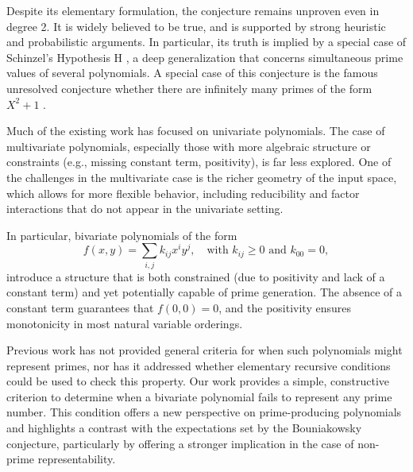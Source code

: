 \documentclass[a4paper,11pt]{article}
\begin{document}
	Despite its elementary formulation, the conjecture remains unproven even in degree 2. It is widely believed to be true, and is supported by strong heuristic and probabilistic arguments. In particular, its truth is implied by a special case of Schinzel's Hypothesis H \cite{bodin}, a deep generalization that concerns simultaneous prime values of several polynomials. A special case of this conjecture is the famous unresolved conjecture whether there are infinitely many primes of the form $X^2+1$ \cite{xsquare}.
	
	Much of the existing work has focused on univariate polynomials. The case of multivariate polynomials, especially those with more algebraic structure or constraints (e.g., missing constant term, positivity), is far less explored. One of the challenges in the multivariate case is the richer geometry of the input space, which allows for more flexible behavior, including reducibility and factor interactions that do not appear in the univariate setting.
	
	In particular, bivariate polynomials of the form
	\[
	f(x, y) = \sum_{i, j} k_{ij} x^i y^j, \quad \text{with } k_{ij} \geq 0 \text{ and } k_{00} = 0,
	\]
	introduce a structure that is both constrained (due to positivity and lack of a constant term) and yet potentially capable of prime generation. The absence of a constant term guarantees that $f(0, 0) = 0$, and the positivity ensures monotonicity in most natural variable orderings.
	
	Previous work has not provided general criteria for when such polynomials might represent primes, nor has it addressed whether elementary recursive conditions could be used to check this property. Our work provides a simple, constructive criterion to determine when a bivariate polynomial fails to represent any prime number. This condition offers a new perspective on prime-producing polynomials and highlights a contrast with the expectations set by the Bouniakowsky conjecture, particularly by offering a stronger implication in the case of non-prime representability.%
	
\end{document}

